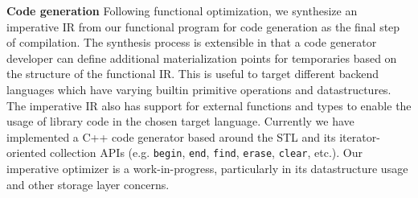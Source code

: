 \noindent\textbf{Code generation} Following functional optimization,
we synthesize an imperative IR from our functional program for code generation
as the final step of compilation. The synthesis process is extensible in that a
code generator developer can define additional materialization points for
temporaries based on the structure of the functional IR. This is useful to
target different backend languages which have varying builtin primitive
operations and datastructures. The imperative IR also has support for external
functions and types to enable the usage of library code in the chosen target
language. Currently we have implemented a C++ code generator based around
the STL and its iterator-oriented collection APIs (e.g. \texttt{begin},
\texttt{end}, \texttt{find}, \texttt{erase}, \texttt{clear}, etc.). Our
imperative optimizer is a work-in-progress, particularly in its datastructure
usage and other storage layer concerns.

